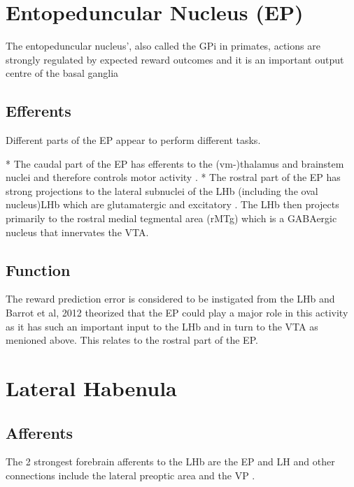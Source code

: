 \documentclass[12pt,a4paper]{article}
\begin{document}
\section{Entopeduncular Nucleus (EP)}

The entopeduncular nucleus’, also called the GPi in primates, actions are
strongly regulated by expected reward outcomes and it is an important output centre of the basal ganglia \citep{Rajakumar1993} 

\subsection{Efferents}

Different parts of the EP appear to perform different tasks. 

  * The caudal part of the EP has efferents to the (vm-)thalamus and brainstem nuclei and therefore controls motor activity \citep{Rajakumar1993}  \citep{Wallace2017}.
  * The rostral part of the EP has strong projections to the lateral subnuclei of the LHb (including the oval nucleus)LHb \citep{Rajakumar1993}\citep{Hong2008} which are glutamatergic and excitatory \citep{Shabel2012} \citep{Wallace2017}. The LHb then projects primarily to the rostral medial tegmental area (rMTg) which is a GABAergic nucleus that innervates the VTA.

\subsection{Function}

The reward prediction error is considered to be instigated from the LHb and Barrot et al, 2012 theorized that the EP could play a major role in this activity as it has such an important input to the LHb \citep{Barrot2012} and in turn to the VTA as menioned above. This relates to the rostral part of the EP.







\section{Lateral Habenula}

\subsection{Afferents}

The 2 strongest forebrain afferents to the LHb are the EP and LH and other connections include the lateral preoptic area and the VP \citep{Parent1981}. 
\end{document}
